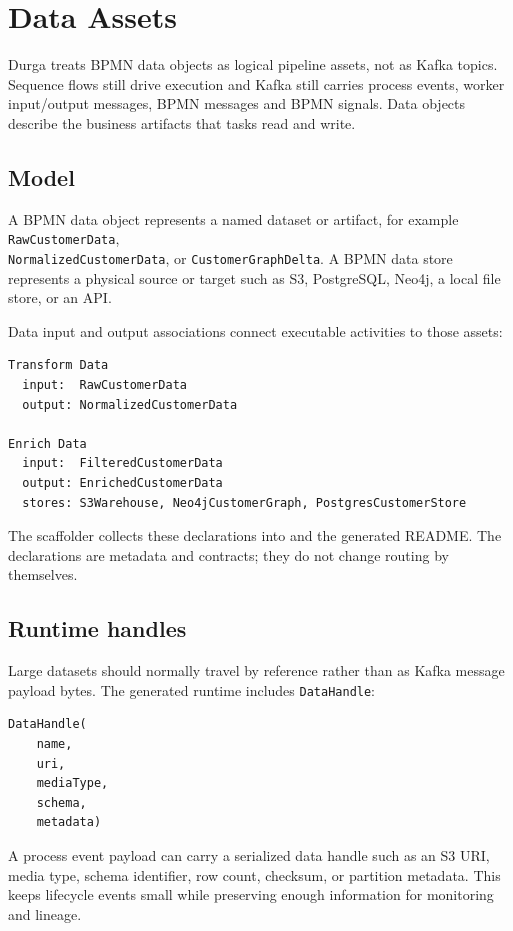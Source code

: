 \section{Data Assets}
\label{sec:DataAssets}

Durga treats BPMN data objects as logical pipeline assets, not as Kafka
topics. Sequence flows still drive execution and Kafka still carries process
events, worker input/output messages, BPMN messages and BPMN signals. Data
objects describe the business artifacts that tasks read and write.

\subsection{Model}

A BPMN data object represents a named dataset or artifact, for example
\texttt{RawCustomerData}, \\ \texttt{NormalizedCustomerData}, or
\texttt{CustomerGraphDelta}. A BPMN data store represents a physical source or
target such as S3, PostgreSQL, Neo4j, a local file store, or an API.

Data input and output associations connect executable activities to those
assets:

\begin{verbatim}
Transform Data
  input:  RawCustomerData
  output: NormalizedCustomerData

Enrich Data
  input:  FilteredCustomerData
  output: EnrichedCustomerData
  stores: S3Warehouse, Neo4jCustomerGraph, PostgresCustomerStore
\end{verbatim}

The scaffolder collects these declarations into  and
the generated README. The declarations are metadata and contracts; they do not
change routing by themselves.

\subsection{Runtime handles}

Large datasets should normally travel by reference rather than as Kafka message
payload bytes. The generated runtime includes \texttt{DataHandle}:

\begin{verbatim}
DataHandle(
    name,
    uri,
    mediaType,
    schema,
    metadata)
\end{verbatim}

A process event payload can carry a serialized data handle such as an S3 URI,
media type, schema identifier, row count, checksum, or partition metadata. This
keeps lifecycle events small while preserving enough information for monitoring
and lineage.

